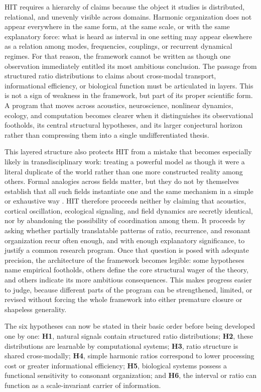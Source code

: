 HIT requires a hierarchy of claims because the object it studies is distributed, relational, and unevenly visible across domains. Harmonic organization does not appear everywhere in the same form, at the same scale, or with the same explanatory force: what is heard as interval in one setting may appear elsewhere as a relation among modes, frequencies, couplings, or recurrent dynamical regimes. For that reason, the framework cannot be written as though one observation immediately entitled its most ambitious conclusion. The passage from structured ratio distributions to claims about cross-modal transport, informational efficiency, or biological function must be articulated in layers. This is not a sign of weakness in the framework, but part of its proper scientific form. A program that moves across acoustics, neuroscience, nonlinear dynamics, ecology, and computation becomes clearer when it distinguishes its observational footholds, its central structural hypotheses, and its larger conjectural horizon rather than compressing them into a single undifferentiated thesis.

This layered structure also protects HIT from a mistake that becomes especially likely in transdisciplinary work: treating a powerful model as though it were a literal duplicate of the world rather than one more constructed reality among others. Formal analogies across fields matter, but they do not by themselves establish that all such fields instantiate one and the same mechanism in a simple or exhaustive way \parencite{calvo_2006}. HIT therefore proceeds neither by claiming that acoustics, cortical oscillation, ecological signaling, and field dynamics are secretly identical, nor by abandoning the possibility of coordination among them. It proceeds by asking whether partially translatable patterns of ratio, recurrence, and resonant organization recur often enough, and with enough explanatory significance, to justify a common research program. Once that question is posed with adequate precision, the architecture of the framework becomes legible: some hypotheses name empirical footholds, others define the core structural wager of the theory, and others indicate its more ambitious consequences. This makes progress easier to judge, because different parts of the program can be strengthened, limited, or revised without forcing the whole framework into either premature closure or shapeless generality.

The six hypotheses can now be stated in their basic order before being developed one by one: \textbf{H1}, natural signals contain structured ratio distributions; \textbf{H2}, these distributions are learnable by computational systems; \textbf{H3}, ratio structure is shared cross-modally; \textbf{H4}, simple harmonic ratios correspond to lower processing cost or greater informational efficiency; \textbf{H5}, biological systems possess a functional sensitivity to consonant organization; and \textbf{H6}, the interval or ratio can function as a scale-invariant carrier of information.

